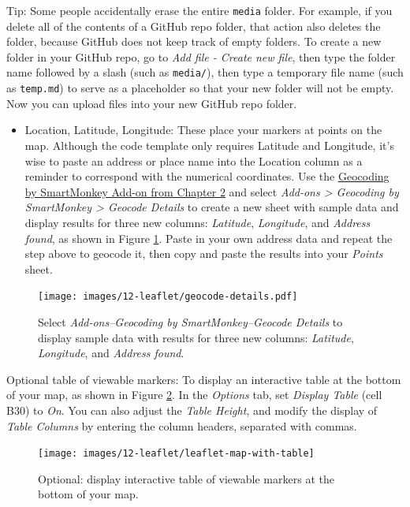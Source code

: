 \documentclass[
  english,
]{book}
\providecommand{\tightlist}{%
  \setlength{\itemsep}{0pt}\setlength{\parskip}{0pt}}
\begin{document}
Tip: Some people accidentally erase the entire \texttt{media} folder. For example, if you delete all of the contents of a GitHub repo folder, that action also deletes the folder, because GitHub does not keep track of empty folders. To create a new folder in your GitHub repo, go to \emph{Add file - Create new file}, then type the folder name followed by a slash (such as \texttt{media/}), then type a temporary file name (such as \texttt{temp.md}) to serve as a placeholder so that your new folder will not be empty. Now you can upload files into your new GitHub repo folder.

\begin{itemize}
\tightlist
\item
  Location, Latitude, Longitude: These place your markers at points on the map. Although the code template only requires Latitude and Longitude, it's wise to paste an address or place name into the Location column as a reminder to correspond with the numerical coordinates. Use the \href{geocode.html}{Geocoding by SmartMonkey Add-on from Chapter 2} and select \emph{Add-ons \textgreater{} Geocoding by SmartMonkey \textgreater{} Geocode Details} to create a new sheet with sample data and display results for three new columns: \emph{Latitude}, \emph{Longitude}, and \emph{Address found}, as shown in Figure \ref{fig:geocode-details2}. Paste in your own address data and repeat the step above to geocode it, then copy and paste the results into your \emph{Points} sheet.
\end{itemize}



\begin{figure}
\centering
\texttt{[image: images/12-leaflet/geocode-details.pdf]}
\caption{\label{fig:geocode-details2}Select \emph{Add-ons--Geocoding by SmartMonkey--Geocode Details} to display sample data with results for three new columns: \emph{Latitude}, \emph{Longitude}, and \emph{Address found}.}
\end{figure}

Optional table of viewable markers: To display an interactive table at the bottom of your map, as shown in Figure \ref{fig:leaflet-map-with-table}. In the \emph{Options} tab, set \emph{Display Table} (cell B30) to \emph{On}. You can also adjust the \emph{Table Height}, and modify the display of \emph{Table Columns} by entering the column headers, separated with commas.



\begin{figure}
\texttt{[image: images/12-leaflet/leaflet-map-with-table]} \caption{Optional: display interactive table of viewable markers at the bottom of your map.}\label{fig:leaflet-map-with-table}
\end{figure}
\end{document}
